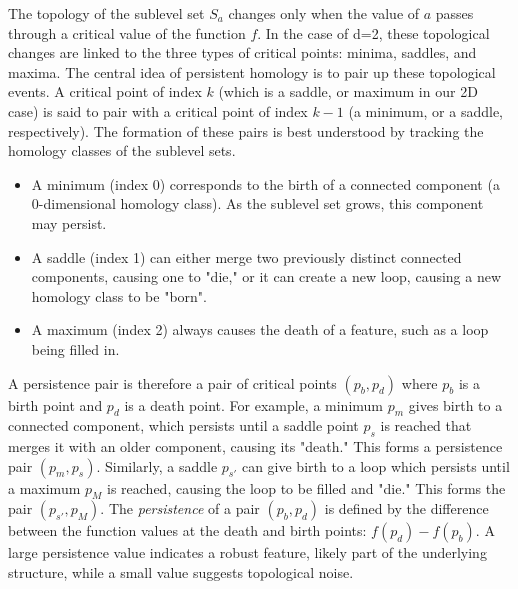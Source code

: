  The topology of the sublevel set $S_a$ changes only when the value of $a$ passes through a critical value of the function $f$. 
 In the case of d=2, these topological changes are linked to the three types of critical points: minima, saddles, and maxima.
The central idea of persistent homology is to pair up these topological events. 
A critical point of index $k$ (which is a saddle, or maximum in our 2D case) is said to pair with a critical point of index $k-1$ (a minimum, or a saddle, respectively). 
The formation of these pairs is best understood by tracking the homology classes of the sublevel sets. 
\begin{itemize}
\item A minimum (index 0) corresponds to the birth of a connected component (a 0-dimensional homology class). As the sublevel set grows, this component may persist.
\item A saddle (index 1) can either merge two previously distinct connected components, causing one to "die," or it can create a new loop, causing a new homology class to be "born".
\item A maximum (index 2) always causes the death of a feature, such as a loop being filled in.
\end{itemize}
A persistence pair is therefore a pair of critical points $(p_b,p_d)$ where $p_b$ is a birth point and $p_d$ is a death point. 
For example, a minimum $p_m$ gives birth to a connected component, which persists until a saddle point $p_s$ is reached that merges it with an older component, causing its "death." This forms a persistence pair $(p_m,p_s)$.  
Similarly, a saddle $p_{s'}$  can give birth to a loop which persists until a maximum $p_M$ is reached, causing the loop to be filled and "die." 
This forms the pair $(p_{s'},p_M)$.  
The \emph{persistence} of a pair $(p_b,p_d)$ is defined by the difference between the function values at the death and birth points: $f(p_d)-f(p_b)$.
A large persistence value indicates a robust feature, likely part of the underlying structure, while a small value suggests topological noise.
 
